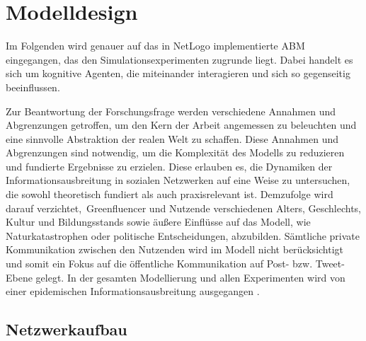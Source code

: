 \documentclass[runningheads]{llncs}
\begin{document}

\section{Modelldesign}\label{Modelldesign}
Im Folgenden wird genauer auf das in NetLogo implementierte ABM eingegangen, das den Simulationsexperimenten zugrunde liegt. Dabei handelt es sich um kognitive Agenten, die miteinander interagieren und sich so gegenseitig beeinflussen. 

Zur Beantwortung der Forschungsfrage werden verschiedene Annahmen und Abgrenzungen getroffen, um den Kern der Arbeit angemessen zu beleuchten und eine sinnvolle Abstraktion der realen Welt zu schaffen. 
Diese Annahmen und Abgrenzungen sind notwendig, um die Komplexität des Modells zu reduzieren und fundierte Ergebnisse zu erzielen. 
Diese erlauben es, die Dynamiken der Informationsausbreitung in sozialen Netzwerken auf eine Weise zu untersuchen, die sowohl theoretisch fundiert als auch praxisrelevant ist.
Demzufolge wird darauf verzichtet, Greenfluencer und Nutzende verschiedenen Alters, Geschlechts, Kultur und Bildungsstands sowie äußere Einflüsse auf das Modell, wie Naturkatastrophen oder politische Entscheidungen, abzubilden. 
Sämtliche private Kommunikation zwischen den Nutzenden wird im Modell nicht berücksichtigt und somit ein Fokus auf die öffentliche Kommunikation auf Post- bzw. Tweet-Ebene gelegt. 
In der gesamten Modellierung und allen Experimenten wird von einer epidemischen Informationsausbreitung ausgegangen \cite{abdullah_epidemic_2011}. 

\subsection{Netzwerkaufbau}
\end{document}
